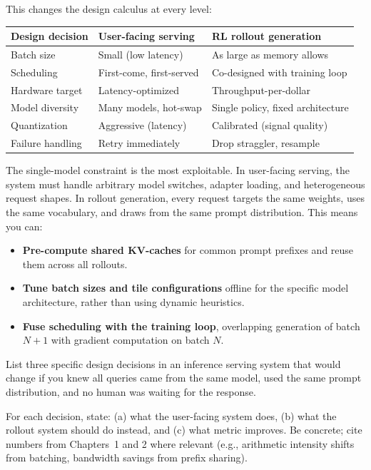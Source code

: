 This changes the design calculus at every level:

\begin{center}
\small
\begin{tabular}{@{}lll@{}}
\toprule
\textbf{Design decision} & \textbf{User-facing serving} & \textbf{RL rollout generation} \\
\midrule
Batch size        & Small (low latency)    & As large as memory allows \\
Scheduling        & First-come, first-served & Co-designed with training loop \\
Hardware target   & Latency-optimized      & Throughput-per-dollar \\
Model diversity   & Many models, hot-swap  & Single policy, fixed architecture \\
Quantization      & Aggressive (latency)   & Calibrated (signal quality) \\
Failure handling  & Retry immediately      & Drop straggler, resample \\
\bottomrule
\end{tabular}
\end{center}

The single-model constraint is the most exploitable. In user-facing serving, the system must handle arbitrary model switches, adapter loading, and heterogeneous request shapes. In rollout generation, every request targets the same weights, uses the same vocabulary, and draws from the same prompt distribution. This means you can:

\begin{itemize}
  \item \textbf{Pre-compute shared KV-caches} for common prompt prefixes and reuse them across all rollouts.
  \item \textbf{Tune batch sizes and tile configurations} offline for the specific model architecture, rather than using dynamic heuristics.
  \item \textbf{Fuse scheduling with the training loop}, overlapping generation of batch $N+1$ with gradient computation on batch $N$.
\end{itemize}

\begin{thinkfirst}
List three specific design decisions in an inference serving system that would change if you knew all queries came from the same model, used the same prompt distribution, and no human was waiting for the response.

For each decision, state: (a) what the user-facing system does, (b) what the rollout system should do instead, and (c) what metric improves. Be concrete; cite numbers from Chapters~1 and 2 where relevant (e.g., arithmetic intensity shifts from batching, bandwidth savings from prefix sharing).
\end{thinkfirst}

